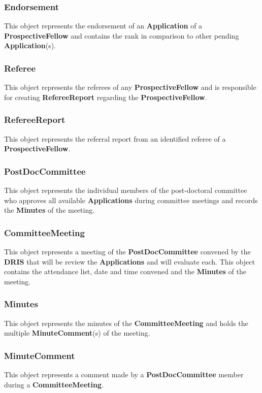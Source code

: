 \documentclass[12pt]{article}
\begin{document}
\subsubsection{Endorsement}
This object represents the endorsement of an \textbf{Application} of a \textbf{ProspectiveFellow} and contains the rank in comparison to other pending \textbf{Application}(s).

\subsubsection{Referee}
This object represents the referees of any \textbf{ProspectiveFellow} and is responsible for creating \textbf{RefereeReport} regarding the \textbf{ProspectiveFellow}.

\subsubsection{RefereeReport}
This object represents the referral report from an identified referee of a \textbf{ProspectiveFellow}.

\subsubsection{PostDocCommittee}
This object represents the individual members of the post-doctoral committee who approves all available \textbf{Applications} during committee meetings and records the \textbf{Minutes} of the meeting.

\subsubsection{CommitteeMeeting}
This object represents a meeting of the \textbf{PostDocCommittee} convened by the \textbf{DRIS} that will be review the \textbf{Applications} and will evaluate each. This object contains the attendance list, date and time convened and the \textbf{Minutes} of the meeting.

\subsubsection{Minutes}
This object represents the minutes of the \textbf{CommitteeMeeting} and holds the multiple \textbf{MinuteComment}(s) of the meeting.

\subsubsection{MinuteComment}
This object represents a comment made by a \textbf{PostDocCommittee} member during a \textbf{CommitteeMeeting}.
\end{document}

